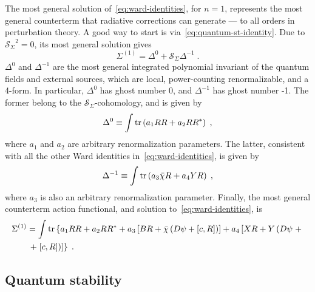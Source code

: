 \documentclass[../main.tex]{subfiles}
\begin{document}
The most general solution of~\eqref{eq:ward-identities}, for $n=1$, represents the most general counterterm that radiative corrections can generate --- to all orders in perturbation theory. A good way to start is via~\eqref{eq:quantum-st-identity}. Due to $ {\mathcal{S}_{\Sigma}}^{ 2 } = 0 $, its most general solution gives
\begin{equation}
  \label{eq:solution-to-quantum-st}
  \Sigma^{ (1) } = \Delta^0 + \mathcal{S}_{ \Sigma } \Delta^{ -1 }\;.
\end{equation}
$ \Delta^0 $ and $ \Delta^{ -1 } $ are the most general integrated polynomial invariant of the quantum fields and external sources, which are local, power-counting renormalizable, and a 4-form. In particular, $ \Delta^0 $ has ghost number 0, and $ \Delta^{ -1 } $ has ghost number -1. The former belong to the $ \mathcal{S}_{ \Sigma } $-cohomology, and is given by
\begin{equation}
  \label{eq:delta0}
  \Delta^0 \equiv \int \operatorname{tr} \left( a_1 RR + a_2 RR^* \right) \;,
\end{equation}
where $ a_1 $ and $ a_2 $ are arbitrary renormalization parameters. The latter, consistent with all the other Ward identities in~\eqref{eq:ward-identities}, is given by
\begin{equation}
  \label{eq:delta-1}
  \Delta^{-1} \equiv \int \operatorname{tr} \left( a_3 \bar{ \chi } R + a_4 YR \right) \;,
\end{equation}
where $ a_3 $ is also an arbitrary renormalization parameter. Finally, the most general counterterm action functional, and solution to~\eqref{eq:ward-identities}, is
\begin{align}
  \label{eq:ct-action}
  \Sigma^{ (1) } & = \int \operatorname{tr} \left\{ a_1 R R + a_2 R R^* + a_3 \left[ B R + \bar{ \chi } \left( D \psi + \left[ c, R \right] \right) \right] + a_4 \left[ XR + Y \left( D \psi \right. + \right. \right. \nonumber \\
                 & \left. \left. + \left. \left[ c, R \right] \right) \right] \right\} \;.
\end{align}

\subsection{Quantum stability}\label{sec:stability;sec:quantum}
\end{document}
